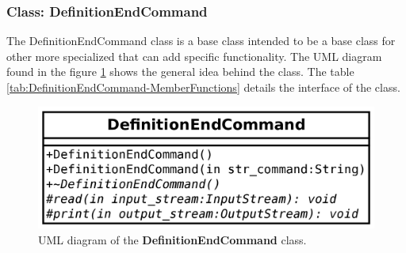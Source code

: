 \documentclass[11pt,twoside,openany,x11names,svgnames]{memoir}
\begin{document}
\subsubsection{Class: DefinitionEndCommand}\label{Class-DefinitionEndCommand}

The DefinitionEndCommand class is a base class intended to be a base class for other more specialized that can add specific functionality. The UML diagram found in the figure \ref{fig:class-definitionend-command} shows the general idea behind the class. The table \ref{tab:DefinitionEndCommand-MemberFunctions} details the interface of the class.

\begin{figure}
	\centering
	\includegraphics[scale=0.2, clip=true, trim= 0pt 0pt 0pt 0pt]{images/chapter03-image28}
	\caption{UML diagram of the \textbf{DefinitionEndCommand} class.}
	\label{fig:class-definitionend-command}
\end{figure}
\end{document}
